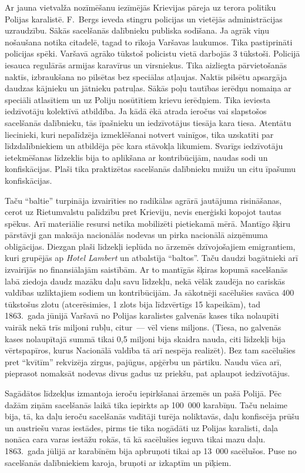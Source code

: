 \documentclass[twoside,a5paper,12pt,fleqn,openany]{extbook}
\newcommand{\pltxti}[1]{\textit{\textpolish{#1}}}
\begin{document}
Ar jauna vietvalža nozīmēšanu iezīmējās Krievijas pāreja uz terora politiku Polijas karalistē. F.~Bergs ieveda stingru policijas un vietējās administrācijas uzraudzību. Sākās sacelšanās dalībnieku publiska sodīšana. Ja agrāk viņu nošaušana notika citadelē, tagad to rīkoja Varšavas laukumos. Tika pastiprināti policijas spēki. Varšavā agrāko tūkstoš policistu vietā darbojās 3 tūkstoši. Policijā iesauca regulārās armijas karavīrus un virsniekus. Tika aizliegta pārvietošanās naktīs, izbraukšana no pilsētas bez speciālas atļaujas. Naktīs pilsētu apsargāja daudzas kājnieku un jātnieku patruļas. Sākās poļu tautības ierēdņu nomaiņa ar speciāli atlasītiem un uz Poliju nosūtītiem krievu ierēdņiem. Tika ieviesta iedzīvotāju kolektīvā atbildība. Ja kādā ēkā atrada ieročus vai slapstošos sacelšanās dalībnieku, tās īpašnieku un iedzīvotājus tiesāja kara tiesa. Atentātu liecinieki, kuri nepalīdzēja izmeklēšanai notvert vainīgos, tika uzskatīti par līdzdalībniekiem un atbildēja pēc kara stāvokļa likumiem. Svarīgs iedzīvotāju ietekmēšanas līdzeklis bija to aplikšana ar kontribūcijām, naudas sodi un konfiskācijas. Plaši tika praktizētas sacelšanās dalībnieku muižu un citu īpašumu konfiskācijas.

Taču ``baltie'' turpināja izvairīties no radikālas agrārā jautājuma risināšanas, cerot uz Rietumvalstu palīdzību pret Krieviju, nevis enerģiski kopojot tautas spēkus. Arī materiālie resursi netika mobilizēti pietiekamā mērā. Mantīgo šķiru pārstāvji gan maksāja nacionālās nodevas un pirka nacionālā aizņēmuma obligācijas. Diezgan plaši līdzekļi ieplūda no ārzemēs dzīvojošajiem emigrantiem, kuri grupējās ap \pltxti{Hotel Lambert} un atbalstīja ``baltos''. Taču daudzi bagātnieki arī izvairījās no finansiālajām saistībām. Ar to mantīgās šķiras kopumā sacelšanās labā ziedoja daudz mazāku daļu savu līdzekļu, nekā vēlāk zaudēja no cariskās valdības uzliktajiem sodiem un kontribūcijām. Ja sākotnēji sacēlušies savāca 400 tūkstošus zlotu (atcerēsimies, 1 zlots bija līdzvērtīgs 15 kapeikām), tad 1863.~gada jūnijā Varšavā no Polijas karalistes galvenās kases tika nolaupīti vairāk nekā trīs miljoni rubļu, citur~--- vēl viens miljons. (Tiesa, no galvenās kases nolaupītajā summā tikai 0,5 miljoni bija skaidra nauda, citi līdzekļi bija vērtspapīros, kurus Nacionālā valdība tā arī nespēja realizēt). Bez tam sacēlušies pret ``kvītīm'' rekvizēja zirgus, pajūgus, apģērbu un pārtiku. Naudu vāca arī, pieprasot nomaksāt nodevas divus gadus uz priekšu, pat aplaupot iedzīvotājus.

Sagādātos līdzekļus izmantoja ieroču iepirkšanai ārzemēs un pašā Polijā. Pēc dažām ziņām sacelšanās laikā tika iepirkts ap 100~000 karabīņu. Taču nelaime bija, tā, ka daļu ieroču sacelšanās vadītāji turēja noliktavās, daļu konfiscēja prūšu un austriešu varas iestādes, pirms tie tika nogādāti uz Polijas karalisti, daļa nonāca cara varas iestāžu rokās, tā kā sacēlušies ieguva tikai mazu daļu. 1863.~gada jūlijā ar karabīnēm bija apbruņoti tikai ap 13~000 sacēlušos. Puse no sacelšanās dalībniekiem karoja, bruņoti ar izkaptīm un pīķiem.
\end{document}
